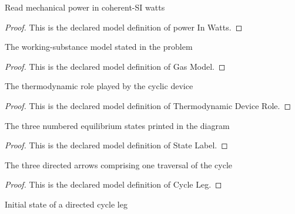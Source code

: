 \begin{definition}
  \label{def:physics:phyx-mini-0479:phyxminiproblems-problemphyxmini0479-powerinwatts}
  Read mechanical power in coherent-SI watts
\end{definition}
\begin{proof}
  This is the declared model definition of power In Watts.
\end{proof}
\begin{definition}
  \label{def:physics:phyx-mini-0479:phyxminiproblems-problemphyxmini0479-gasmodel}
  The working-substance model stated in the problem
\end{definition}
\begin{proof}
  This is the declared model definition of Gas Model.
\end{proof}
\begin{definition}
  \label{def:physics:phyx-mini-0479:phyxminiproblems-problemphyxmini0479-thermodynamicdevicerole}
  The thermodynamic role played by the cyclic device
\end{definition}
\begin{proof}
  This is the declared model definition of Thermodynamic Device Role.
\end{proof}
\begin{definition}
  \label{def:physics:phyx-mini-0479:phyxminiproblems-problemphyxmini0479-statelabel}
  The three numbered equilibrium states printed in the diagram
\end{definition}
\begin{proof}
  This is the declared model definition of State Label.
\end{proof}
\begin{definition}
  \label{def:physics:phyx-mini-0479:phyxminiproblems-problemphyxmini0479-cycleleg}
  The three directed arrows comprising one traversal of the cycle
\end{definition}
\begin{proof}
  This is the declared model definition of Cycle Leg.
\end{proof}
\begin{definition}
  \label{def:physics:phyx-mini-0479:phyxminiproblems-problemphyxmini0479-cycleleg-initialstate}
  Initial state of a directed cycle leg
\end{definition}
